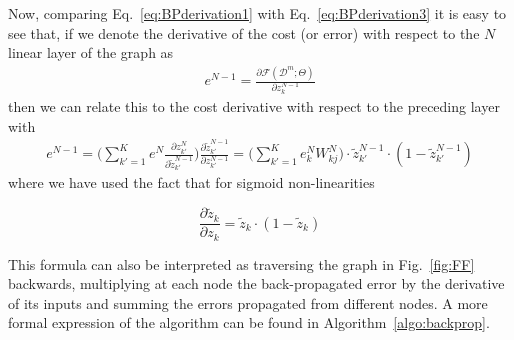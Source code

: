 %
Now, comparing Eq.~\ref{eq:BPderivation1} with Eq.~\ref{eq:BPderivation3} it is easy to see that, if we denote the derivative of the cost (or error) with respect to the $N$ linear layer of the graph as
%
\begin{align}
e^{N-1} = \frac{\partial \mathcal{F}(\mathcal{D}^m;\Theta)}{\partial z_{k}^{N-1}} 
\label{eq:BPderivation4}
\end{align}
%
\noindent then we can relate this to the cost derivative with respect to the preceding layer with
%
\begin{align}
e^{N-1} = \bigg(\sum_{k'=1}^{K} e^N \frac{\partial z_{k'}^{N}}{\partial \tilde{z}_{k'}^{N-1}}\bigg)\frac{\partial \tilde{z}_{k'}^{N-1}}{\partial z_{k'}^{N-1}} = \bigg(\sum_{k'=1}^{K} e^N_k W^N_{kj}\bigg)\cdot\tilde{z}_{k'}^{N-1}\cdot(1-\tilde{z}_{k'}^{N-1})
\end{align}
%
where we have used the fact that for sigmoid non-linearities 


\begin{equation}
\frac{\partial \tilde{z}_{k}}{\partial z_{k}} = \tilde{z}_{k}\cdot (1-\tilde{z}_{k})
\end{equation}

This formula can also be interpreted as traversing the graph in Fig.~\ref{fig:FF} backwards, multiplying at each node the back-propagated error by the derivative of its inputs and summing the errors propagated from different nodes. A more formal expression of the algorithm can be found in Algorithm~\ref{algo:backprop}.

